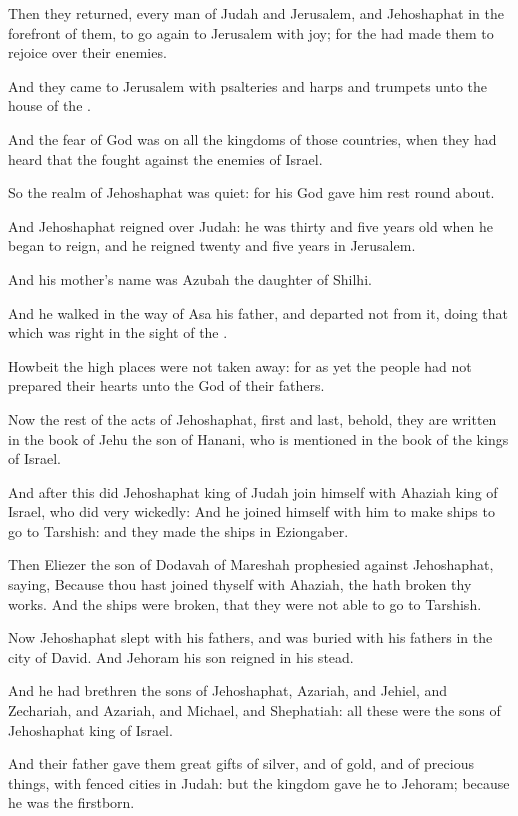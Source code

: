 \Verse Then they returned, every man of Judah and Jerusalem, and Jehoshaphat in the forefront of them, to go again to Jerusalem with joy; for the \LORD had made them to rejoice over their enemies.

\Verse And they came to Jerusalem with psalteries and harps and trumpets unto the house of the \LORD.

\Verse And the fear of God was on all the kingdoms of those countries, when they had heard that the \LORD fought against the enemies of Israel.

\Verse So the realm of Jehoshaphat was quiet: for his God gave him rest round about.

\Verse And Jehoshaphat reigned over Judah: he was thirty and five years old when he began to reign, and he reigned twenty and five years in Jerusalem.

And his mother's name was Azubah the daughter of Shilhi.

\Verse And he walked in the way of Asa his father, and departed not from it, doing that which was right in the sight of the \LORD.

\Verse Howbeit the high places were not taken away: for as yet the people had not prepared their hearts unto the God of their fathers.

\Verse Now the rest of the acts of Jehoshaphat, first and last, behold, they are written in the book of Jehu the son of Hanani, who is mentioned in the book of the kings of Israel.

\Verse And after this did Jehoshaphat king of Judah join himself with Ahaziah king of Israel, who did very wickedly: \Verse And he joined himself with him to make ships to go to Tarshish: and they made the ships in Eziongaber.

\Verse Then Eliezer the son of Dodavah of Mareshah prophesied against Jehoshaphat, saying, Because thou hast joined thyself with Ahaziah, the \LORD hath broken thy works. And the ships were broken, that they were not able to go to Tarshish.


\Chapter
\Verse Now Jehoshaphat slept with his fathers, and was buried with his fathers in the city of David. And Jehoram his son reigned in his stead.

\Verse And he had brethren the sons of Jehoshaphat, Azariah, and Jehiel, and Zechariah, and Azariah, and Michael, and Shephatiah: all these were the sons of Jehoshaphat king of Israel.

\Verse And their father gave them great gifts of silver, and of gold, and of precious things, with fenced cities in Judah: but the kingdom gave he to Jehoram; because he was the firstborn.

